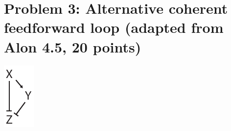 \documentclass{article}
\begin{document}
\section*{Problem 3: Alternative coherent feedforward loop (adapted from Alon 4.5, 20 points)}

\begin{minipage}[b]{0.1\linewidth}
\includegraphics[width=\textwidth]{c3ffl.pdf}
\end{minipage}
\end{document}
